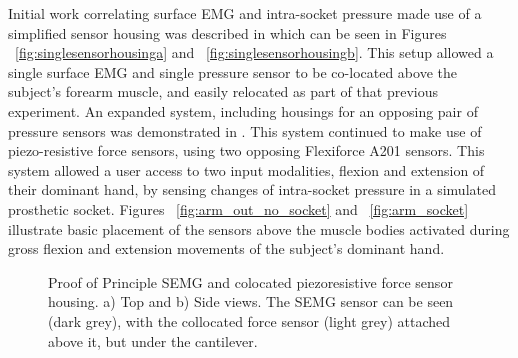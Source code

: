 \documentclass[twocolumn]{sagej}
\begin{document}
Initial work correlating surface EMG and intra-socket pressure made use of a simplified sensor housing was described in \cite{SanfordSPIE2015a} which can be seen in Figures ~\ref{fig:singlesensorhousinga} and ~\ref{fig:singlesensorhousingb}.  This setup allowed a single surface EMG and single pressure sensor to be co-located above the subject's forearm muscle, and easily relocated as part of that previous experiment.  %
An expanded system, including housings for an opposing pair of pressure sensors was demonstrated in \cite{SanfordPETRA02015}.  This system continued to make use of piezo-resistive force sensors, using two opposing Flexiforce A201 sensors.  This system allowed a user access to two input modalities, flexion and extension of their dominant hand, by sensing changes of intra-socket pressure in a simulated prosthetic socket.  %
Figures ~\ref{fig:arm_out_no_socket} and ~\ref{fig:arm_socket} illustrate basic placement of the sensors above the muscle bodies activated during gross flexion and extension movements of the subject's dominant hand.  \par \noindent
\begin{figure}[h]
\centering
{}
 \caption{Proof of Principle SEMG and colocated piezoresistive force sensor housing.  a) Top and b) Side views.  The SEMG sensor can be seen (dark grey), with the collocated force sensor (light grey) attached above it, but under the cantilever.}
\end{figure}
\begin{comment}
\begin{figure}[h]
\centering
\epsfig{figure=2sensor_socket.png,width=1.75in}
 \caption{Second iteration of healthy limb socket (rear view). Sensor housing seen in white.}
 \label{fig:twosensorsocket_worbla}
\end{figure}
\begin{figure}[h]
\centering
\epsfig{figure=two_sensor_socket_rear_view.png,width=2.5in}
 \caption{\textbf{\textit{maybe make the two experimental sockets one figure? Get Picture of Printed SOCKET}}}
 \label{fig:twosensorsocket_CAD}
\end{figure}
\end{comment}
\end{document}
